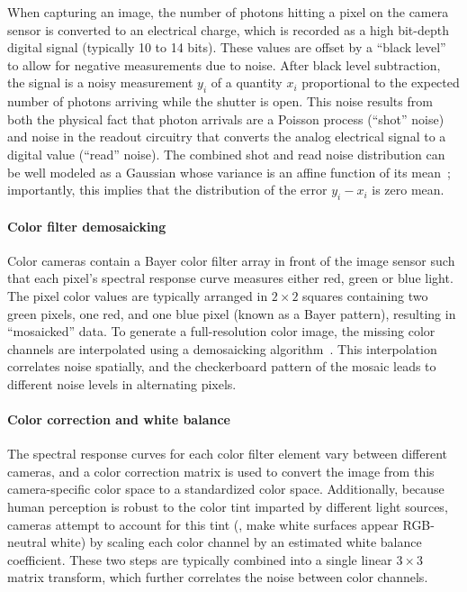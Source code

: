 When capturing an image, the number of photons hitting a pixel on the camera sensor is converted to an electrical charge, which is recorded as a high bit-depth digital signal (typically 10 to 14 bits). These values are offset by a ``black level'' to allow for negative measurements due to noise. After black level subtraction, the signal is a noisy measurement $y_i$ of a quantity $x_i$ proportional to the expected number of photons arriving while the shutter is open. This noise results from both the physical fact that photon arrivals are a Poisson process (``shot'' noise) and noise in the readout circuitry that converts the analog electrical signal to a digital value (``read'' noise). The combined shot and read noise distribution can be well modeled as a Gaussian whose variance is an affine function of its mean~\cite{foi2008noisemodel}; importantly, this implies that the distribution of the error $y_i - x_i$ is zero mean.


\paragraph{Color filter demosaicking} Color cameras contain a Bayer color filter array in front of the image sensor such that each pixel's spectral response curve measures either red, green or blue light. The pixel color values are typically arranged in $2\times 2$ squares containing two green pixels, one red, and one blue pixel (known as a Bayer pattern), resulting in ``mosaicked'' data. To generate a full-resolution color image, the missing color channels are interpolated using a demosaicking algorithm~\cite{li2008demosaic}. 
This interpolation correlates noise spatially, and the checkerboard pattern of the mosaic leads to different noise levels in alternating pixels.





\paragraph{Color correction and white balance} 
The spectral response curves for each color filter element vary between different cameras, and a color correction matrix is used to convert the image from this camera-specific color space to a standardized color space. Additionally, because human perception is robust to the color tint imparted by different light sources, cameras attempt to account for this tint (\ie, make white surfaces appear RGB-neutral white) by scaling each color channel by an estimated white balance coefficient. These two steps are typically combined into a single linear $3\times 3$ matrix transform, which further correlates the noise between color channels.


